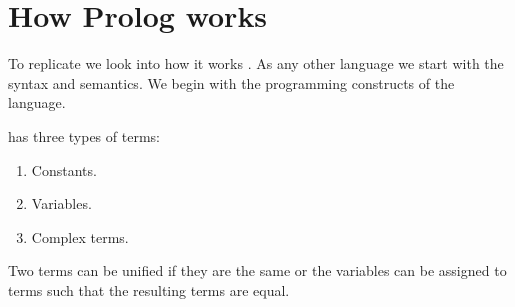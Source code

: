 \documentclass[thesis-solanki.tex]{subfiles}
\begin{document}
\section{How Prolog works}

To replicate  we look into how it works \cite{webiste:learnprolognow}.
%
As any other language we start with the syntax and semantics.
We begin with the programming constructs of the language.

 has three types of terms:
\begin{enumerate}
\item Constants.

\item Variables.

\item Complex terms.
\end{enumerate}

Two terms can be unified if they are the same or the variables can be assigned to terms such that the resulting
terms are equal.
\end{document}
